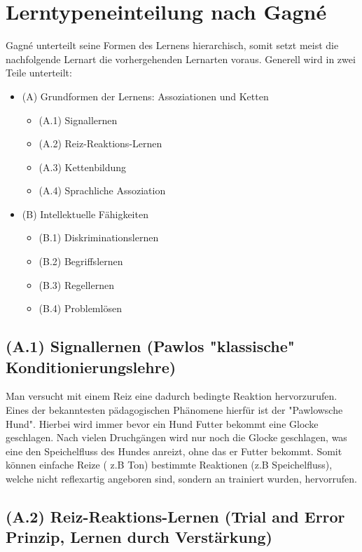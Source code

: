 \section{Lerntypeneinteilung nach Gagné}

Gagné unterteilt seine Formen des Lernens hierarchisch, somit setzt meist die nachfolgende Lernart die vorhergehenden Lernarten voraus. Generell wird in zwei Teile unterteilt: 
\begin{itemize}
\item (A) Grundformen der Lernens: Assoziationen und Ketten 
    \begin{itemize}
        \item (A.1) Signallernen
        \item (A.2) Reiz-Reaktions-Lernen
        \item (A.3) Kettenbildung
        \item (A.4) Sprachliche Assoziation
    \end{itemize}
\item (B) Intellektuelle Fähigkeiten
    \begin{itemize}
        \item (B.1) Diskriminationslernen
        \item (B.2) Begriffslernen
        \item (B.3) Regellernen 
        \item (B.4) Problemlösen
    \end{itemize}
\end{itemize}

\subsection[]{(A.1) Signallernen (Pawlos "klassische" Konditionierungslehre)}

Man versucht mit einem Reiz eine dadurch bedingte Reaktion hervorzurufen. Eines der bekanntesten pädagogischen Phänomene hierfür ist der "Pawlowsche Hund". Hierbei wird immer bevor ein Hund Futter bekommt eine Glocke geschlagen. Nach vielen Druchgängen wird nur noch die Glocke geschlagen, was eine den Speichelfluss des Hundes anreizt, ohne das er Futter bekommt. Somit können einfache Reize ( z.B Ton) bestimmte Reaktionen (z.B Speichelfluss), welche nicht reflexartig angeboren sind, sondern an trainiert wurden, hervorrufen. %

\subsection[]{(A.2) Reiz-Reaktions-Lernen (Trial and Error Prinzip, Lernen durch Verstärkung)}

